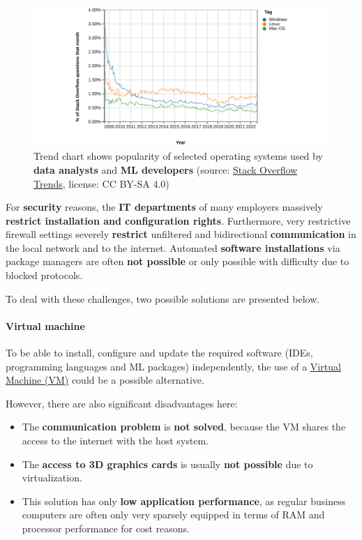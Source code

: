 \documentclass [oneside,10pt,a4paper,ngerman,BCOR10mm,headsepline,parindent,final]{scrartcl}
\providecommand{\tightlist}{%
      \setlength{\itemsep}{0pt}\setlength{\parskip}{0pt}}
\begin{document}
\begin{figure}
\centering
\includegraphics{images/2022-09-07_StackOverflowTrends_OperatingSystems_wide.png}
\caption{Trend chart shows popularity of selected operating systems used
by \textbf{data analysts} and \textbf{ML developers} (source:
\href{https://insights.stackoverflow.com/trends?tags=windows\%2Clinux\%2Cmacos}{Stack
Overflow Trends}, license: CC BY-SA 4.0)}
\end{figure}

For \textbf{security} reasons, the \textbf{IT departments} of many
employers massively \textbf{restrict installation and configuration
rights}. Furthermore, very restrictive firewall settings severely
\textbf{restrict} unfiltered and bidirectional \textbf{communication} in
the local network and to the internet. Automated \textbf{software
installations} via package managers are often \textbf{not possible} or
only possible with difficulty due to blocked protocols.

To deal with these challenges, two possible solutions are presented
below.

    \hypertarget{virtual-machine}{%
\paragraph{Virtual machine}\label{virtual-machine}}

To be able to install, configure and update the required software (IDEs,
programming languages and ML packages) independently, the use of a
\href{https://en.wikipedia.org/wiki/Virtual_machine}{Virtual Machine
(VM)} could be a possible alternative.

However, there are also significant disadvantages here:

\begin{itemize}
\tightlist
\item
  The \textbf{communication problem} is \textbf{not solved}, because the
  VM shares the access to the internet with the host system.
\item
  The \textbf{access to 3D graphics cards} is usually \textbf{not
  possible} due to virtualization.
\item
  This solution has only \textbf{low application performance}, as
  regular business computers are often only very sparsely equipped in
  terms of RAM and processor performance for cost reasons.
\end{itemize}
\end{document}
